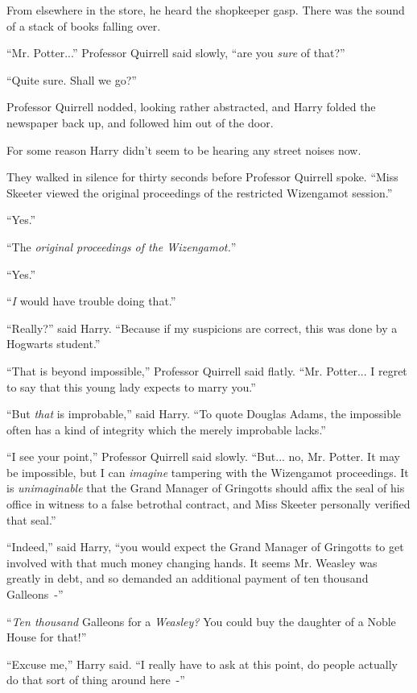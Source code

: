 From elsewhere in the store, he heard the shopkeeper gasp. There was the sound of a stack of books falling over.

``Mr. Potter...'' Professor Quirrell said slowly, ``are you \emph{sure} of that?''

``Quite sure. Shall we go?''

Professor Quirrell nodded, looking rather abstracted, and Harry folded the newspaper back up, and followed him out of the door.

For some reason Harry didn't seem to be hearing any street noises now.

They walked in silence for thirty seconds before Professor Quirrell spoke. ``Miss Skeeter viewed the original proceedings of the restricted Wizengamot session.''

``Yes.''

``The \emph{original proceedings of the Wizengamot.}''

``Yes.''

``\emph{I} would have trouble doing that.''

``Really?'' said Harry. ``Because if my suspicions are correct, this was done by a Hogwarts student.''

``That is beyond impossible,'' Professor Quirrell said flatly. ``Mr. Potter... I regret to say that this young lady expects to marry you.''

``But \emph{that} is improbable,'' said Harry. ``To quote Douglas Adams, the impossible often has a kind of integrity which the merely improbable lacks.''

``I see your point,'' Professor Quirrell said slowly. ``But... no, Mr. Potter. It may be impossible, but I can \emph{imagine} tampering with the Wizengamot proceedings. It is \emph{unimaginable} that the Grand Manager of Gringotts should affix the seal of his office in witness to a false betrothal contract, and Miss Skeeter personally verified that seal.''

``Indeed,'' said Harry, ``you would expect the Grand Manager of Gringotts to get involved with that much money changing hands. It seems Mr. Weasley was greatly in debt, and so demanded an additional payment of ten thousand Galleons~-''

``\emph{Ten thousand} Galleons for a \emph{Weasley?} You could buy the daughter of a Noble House for that!''

``Excuse me,'' Harry said. ``I really have to ask at this point, do people actually do that sort of thing around here~-''

